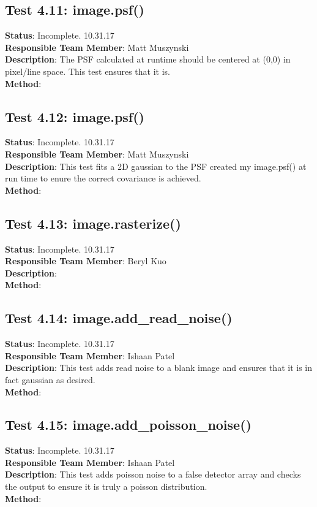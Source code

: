 \documentclass[]{DINOReportMemo}
\begin{document}
\subsection{Test 4.11: image.psf()}
\textbf{Status}: Incomplete. 10.31.17\\
\textbf{Responsible Team Member}: Matt Muszynski \\
\textbf{Description}: The PSF calculated at runtime should be centered at (0,0) in pixel/line space. This test ensures that it is.\\
\textbf{Method}: \\

\subsection{Test 4.12: image.psf()}
\textbf{Status}: Incomplete. 10.31.17\\
\textbf{Responsible Team Member}: Matt Muszynski \\
\textbf{Description}: This test fits a 2D gaussian to the PSF created my image.psf() at run time to enure the correct covariance is achieved.\\
\textbf{Method}: \\

\subsection{Test 4.13: image.rasterize()}
\textbf{Status}: Incomplete. 10.31.17\\
\textbf{Responsible Team Member}: Beryl Kuo \\
\textbf{Description}: \\
\textbf{Method}: \\

\subsection{Test 4.14: image.add\_read\_noise()}
\textbf{Status}: Incomplete. 10.31.17\\
\textbf{Responsible Team Member}: Ishaan Patel \\
\textbf{Description}: This test adds read noise to a blank image and ensures that it is in fact gaussian as desired.\\
\textbf{Method}: \\

\subsection{Test 4.15: image.add\_poisson\_noise()}
\textbf{Status}: Incomplete. 10.31.17\\
\textbf{Responsible Team Member}: Ishaan Patel \\
\textbf{Description}: This test adds poisson noise to a false detector array and checks the output to ensure it is truly a poisson distribution.\\
\textbf{Method}: \\
\end{document}
